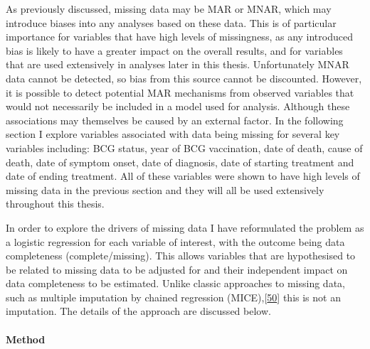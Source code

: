 \documentclass[11pt,twoside]{bristolthesis}
\begin{document}
  As previously discussed, missing data may be MAR or MNAR, which may introduce biases into any analyses based on these data. This is of particular importance for variables that have high levels of missingness, as any introduced bias is likely to have a greater impact on the overall results, and for variables that are used extensively in analyses later in this thesis. Unfortunately MNAR data cannot be detected, so bias from this source cannot be discounted. However, it is possible to detect potential MAR mechanisms from observed variables that would not necessarily be included in a model used for analysis. Although these associations may themselves be caused by an external factor. In the following section I explore variables associated with data being missing for several key variables including: BCG status, year of BCG vaccination, date of death, cause of death, date of symptom onset, date of diagnosis, date of starting treatment and date of ending treatment. All of these variables were shown to have high levels of missing data in the previous section and they will all be used extensively throughout this thesis.
  
  In order to explore the drivers of missing data I have reformulated the problem as a logistic regression for each variable of interest, with the outcome being data completeness (complete/missing). This allows variables that are hypothesised to be related to missing data to be adjusted for and their independent impact on data completeness to be estimated. Unlike classic approaches to missing data, such as multiple imputation by chained regression (MICE),{[}\protect\hyperlink{ref-Groothuis-oudshoorn}{50}{]} this is not an imputation. The details of the approach are discussed below.
  
  \hypertarget{method}{%
  \paragraph{Method}\label{method}}
  
\end{document}
